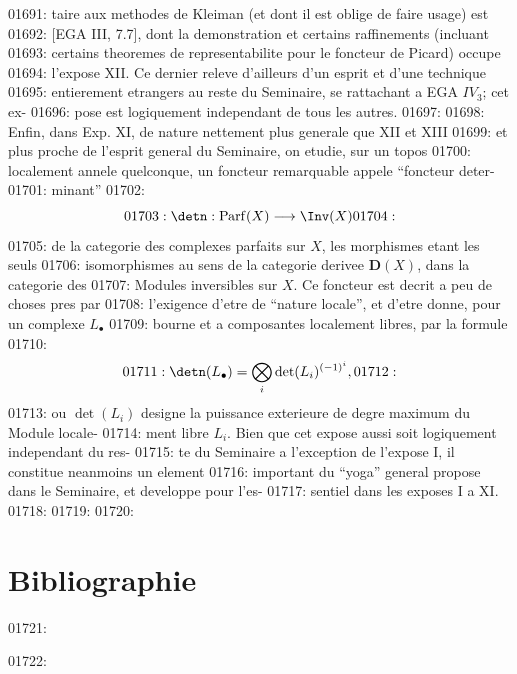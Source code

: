 01691: taire aux methodes de Kleiman (et dont il est oblige de faire usage) est
01692: [EGA III, 7.7], dont la demonstration et certains raffinements (incluant
01693: certains theoremes de representabilite pour le foncteur de Picard) occupe
01694: l'expose XII. Ce dernier releve d'ailleurs d'un esprit et d'une technique
01695: entierement etrangers au reste du Seminaire, se rattachant a EGA $IV_3$; cet ex-
01696: pose est logiquement independant de tous les autres.
01697: 
01698: Enfin, dans Exp. XI, de nature nettement plus generale que XII et XIII
01699: et plus proche de l'esprit general du Seminaire, on etudie, sur un topos
01700: localement annele quelconque, un foncteur remarquable appele ``foncteur deter-
01701: minant''
01702: \begin{equation}
01703: \detn: \mathrm{Parf}(X) \longrightarrow \Inv(X)
01704: \end{equation}
01705: de la categorie des complexes parfaits sur $X$, les morphismes etant les seuls
01706: isomorphismes au sens de la categorie derivee $\mathbf{D}(X)$, dans la categorie des
01707: Modules inversibles sur $X$. Ce foncteur est decrit a peu de choses pres par
01708: l'exigence d'etre de ``nature locale'', et d'etre donne, pour un complexe $L_{\bullet}$
01709: bourne et a composantes localement libres, par la formule
01710: \begin{equation}
01711: \detn(L_{\bullet}) = \bigotimes_i \det(L_i)^{(-1)^i},
01712: \end{equation}
01713: ou $\det(L_i)$ designe la puissance exterieure de degre maximum du Module locale-
01714: ment libre $L_i$. Bien que cet expose aussi soit logiquement independant du res-
01715: te du Seminaire a l'exception de l'expose I, il constitue neanmoins un element
01716: important du ``yoga'' general propose dans le Seminaire, et developpe pour l'es-
01717: sentiel dans les exposes I a XI.
01718: 
01719: 
01720: \section*{Bibliographie}
01721: 
01722: 
